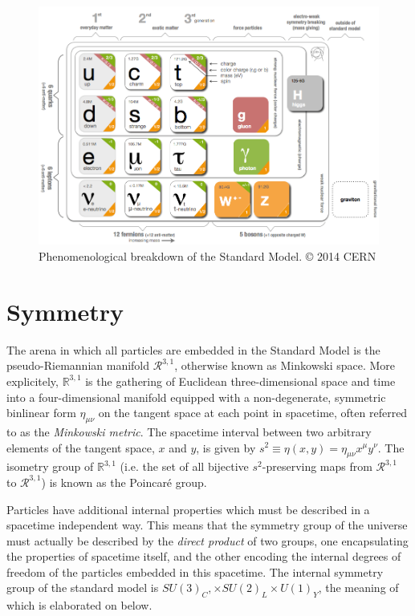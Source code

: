 \begin{figure}[h]
   \centering
    \includegraphics[width=\textwidth]{SMdiagram}
    \caption{Phenomenological breakdown of the Standard Model. © 2014 CERN}
\end{figure}

\section{Symmetry}
The arena in which all particles are embedded in the Standard Model is the pseudo-Riemannian manifold $\mathcal{R}^{3,1}$, otherwise known as Minkowski space.
More explicitely, $\mathbb{R}^{3,1}$ is the gathering of Euclidean three-dimensional space and time into a four-dimensional manifold equipped with a non-degenerate, symmetric binlinear form $\eta_{\mu\nu}$ on the tangent space at each point in spacetime, often referred to as the \textit{Minkowski metric}.
The spacetime interval between two arbitrary elements of the tangent space, $x$ and $y$, is given by $s^2 \equiv \eta(x,y) = \eta_{\mu\nu}x^\mu y^\nu$.
The isometry group of $\mathbb{R}^{3,1}$ (i.e. the set of all bijective $s^2$-preserving maps from $\mathcal{R}^{3,1}$ to $\mathcal{R}^{3,1}$) is known as the Poincar\'{e} group.
 
Particles have additional internal properties which must be described in a spacetime independent way. This means that the symmetry group of the universe must actually be described by the \textit{direct product} of two groups, one encapsulating the properties of spacetime itself, and the other encoding the internal degrees of freedom of the particles embedded in this spacetime.
The internal symmetry group of the standard model is $SU(3)_C, \times SU(2)_L \times U(1)_Y$, the meaning of which is elaborated on below.
 
